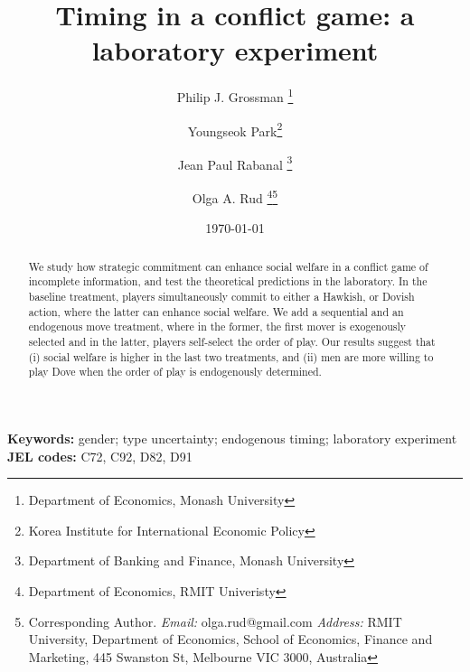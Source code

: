 \documentclass[11pt, letterpaper]{article}
\theoremstyle{plain}
\begin{document}
\newtheorem{Assumption}{Assumption}
\newtheorem{Proposition}{Proposition}
\newtheorem{Corollary}{Corollary}
\newtheorem{Hypothesis}{Hypothesis}
\newtheorem{Result}{Result}


\title{Timing in a conflict game: a laboratory experiment}

\author{Philip J. Grossman
\thanks{Department of Economics, Monash University} \and Youngseok Park\thanks{Korea Institute for International Economic Policy} \and Jean Paul Rabanal
\footnote{Department of Banking and Finance, Monash University} \and Olga A. Rud \footnote{Department of Economics, RMIT Univeristy}\thanks{Corresponding Author. \textit{Email:} olga.rud@gmail.com \textit{Address:} RMIT University, Department of Economics, School of Economics, Finance and Marketing, 445 Swanston St, Melbourne VIC 3000, Australia}}\date{\today}
\maketitle


\begin{abstract}
We study how strategic commitment can enhance social welfare in a conflict game of incomplete information, and test the theoretical predictions in the laboratory. In the baseline treatment, players simultaneously commit to either a Hawkish, or Dovish action, where the latter can enhance social welfare. We add a sequential and an endogenous move treatment, where in the former, the first mover is exogenously selected and in the latter, players self-select the order of play. Our results suggest that (i) social welfare is higher in the last two treatments, and (ii) men are more willing to play Dove when the order of play is endogenously determined.

\end{abstract}
\textbf{Keywords:}
gender; type uncertainty; endogenous timing; laboratory experiment\\
\textbf{JEL codes:} C72, C92, D82, D91
\newpage
\end{document}
